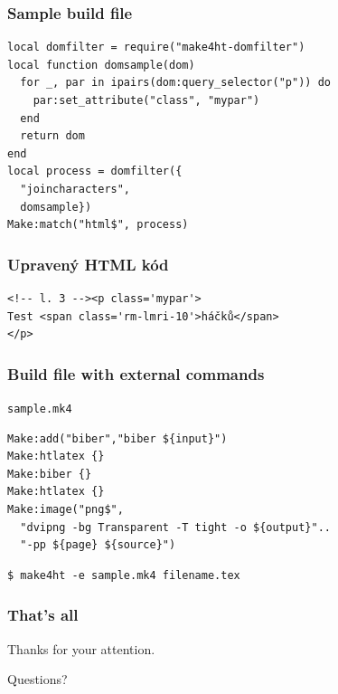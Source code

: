 \begin{frame}[fragile]
  \frametitle{Sample build file}
  \begin{priklad}
\begin{verbatim}
local domfilter = require("make4ht-domfilter")
local function domsample(dom)
  for _, par in ipairs(dom:query_selector("p")) do
    par:set_attribute("class", "mypar")
  end
  return dom
end
local process = domfilter({
  "joincharacters", 
  domsample})
Make:match("html$", process)
\end{verbatim}
  \end{priklad}
\end{frame}

\begin{frame}[fragile]
  \frametitle{Upravený HTML kód}
  \begin{priklad}
\begin{verbatim}
<!-- l. 3 --><p class='mypar'>
Test <span class='rm-lmri-10'>háčků</span> 
</p> 
\end{verbatim}
  \end{priklad}
\end{frame}

\begin{frame}[fragile]
  \frametitle{Build file with external commands}
  \texttt{sample.mk4}
\begin{verbatim}
Make:add("biber","biber ${input}")
Make:htlatex {}
Make:biber {}
Make:htlatex {}
Make:image("png$",                                                          
  "dvipng -bg Transparent -T tight -o ${output}"..
  "-pp ${page} ${source}")
\end{verbatim}
\medskip

\begin{verbatim}
$ make4ht -e sample.mk4 filename.tex
\end{verbatim}
\end{frame}



\begin{frame}
\frametitle{That's all}
\begin{block}{}
Thanks for your attention.

Questions? 
\end{block}
\end{frame}
